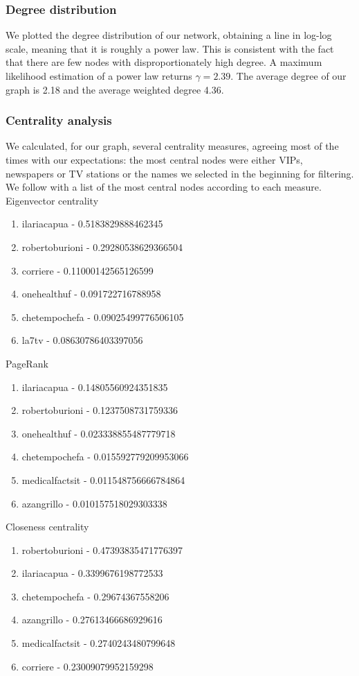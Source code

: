 \documentclass[sigchi]{acmart}
\begin{document}
\subsubsection{Degree distribution}
We plotted the degree distribution of our network, obtaining a line in log-log scale, meaning that it is roughly a power law. This is consistent with the fact that there are few nodes with disproportionately high degree. A maximum likelihood estimation of a power law returns $\gamma = 2.39$. The average degree of our graph is 2.18 and the average weighted degree 4.36.

\subsubsection{Centrality analysis}
We calculated, for our graph, several centrality measures, agreeing most of the times with our expectations: the most central nodes were either VIPs, newspapers or TV stations or the names we selected in the beginning for filtering.
We follow with a list of the most central nodes according to each measure. \\
Eigenvector centrality
\begin{enumerate}
    \item ilariacapua - 0.5183829888462345
    \item robertoburioni - 0.29280538629366504
    \item corriere - 0.11000142565126599
    \item onehealthuf - 0.091722716788958
    \item chetempochefa - 0.09025499776506105
    \item la7tv - 0.08630786403397056
\end{enumerate}

PageRank
\begin{enumerate}
    \item ilariacapua - 0.14805560924351835
    \item robertoburioni - 0.1237508731759336
    \item onehealthuf - 0.023338855487779718
    \item chetempochefa - 0.015592779209953066
    \item medicalfactsit - 0.011548756666784864
    \item azangrillo - 0.010157518029303338
\end{enumerate}

Closeness centrality
\begin{enumerate}
    \item robertoburioni - 0.47393835471776397
    \item ilariacapua - 0.3399676198772533
    \item chetempochefa - 0.29674367558206
    \item azangrillo - 0.27613466686929616
    \item medicalfactsit - 0.2740243480799648
    \item corriere - 0.23009079952159298
\end{enumerate}
\end{document}
